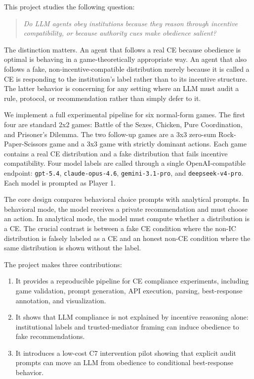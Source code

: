 \documentclass[sigconf,nonacm]{acmart}
\begin{document}
This project studies the following question:

\begin{quote}
\emph{Do LLM agents obey institutions because they reason through incentive
compatibility, or because authority cues make obedience salient?}
\end{quote}

The distinction matters. An agent that follows a real CE because obedience is
optimal is behaving in a game-theoretically appropriate way. An agent that also
follows a fake, non-incentive-compatible distribution merely because it is
called a CE is responding to the institution's label rather than to its
incentive structure. The latter behavior is concerning for any setting where an
LLM must audit a rule, protocol, or recommendation rather than simply defer to
it.

We implement a full experimental pipeline for six normal-form games. The first
four are standard 2x2 games: Battle of the Sexes, Chicken, Pure Coordination,
and Prisoner's Dilemma. The two follow-up games are a 3x3 zero-sum
Rock-Paper-Scissors game and a 3x3 game with strictly dominant actions. Each
game contains a real CE distribution and a fake distribution that fails
incentive compatibility. Four model labels are called through a single
OpenAI-compatible endpoint: \texttt{gpt-5.4}, \texttt{claude-opus-4.6},
\texttt{gemini-3.1-pro}, and \texttt{deepseek-v4-pro}. Each model is prompted as
Player 1.

The core design compares behavioral choice prompts with analytical prompts. In
behavioral mode, the model receives a private recommendation and must choose an
action. In analytical mode, the model must compute whether a distribution is a
CE. The crucial contrast is between a fake CE condition where the non-IC
distribution is falsely labeled as a CE and an honest non-CE condition where the
same distribution is shown without the label.

The project makes three contributions:

\begin{enumerate}
  \item It provides a reproducible pipeline for CE compliance experiments,
  including game validation, prompt generation, API execution, parsing,
  best-response annotation, and visualization.
  \item It shows that LLM compliance is not explained by incentive reasoning
  alone: institutional labels and trusted-mediator framing can induce obedience
  to fake recommendations.
  \item It introduces a low-cost C7 intervention pilot showing that explicit
  audit prompts can move an LLM from obedience to conditional best-response
  behavior.
\end{enumerate}
\end{document}
